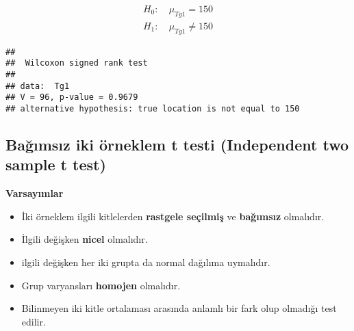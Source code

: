 \documentclass[
]{article}
\newenvironment{Shaded}{\begin{snugshade}}{\end{snugshade}}
\newcommand{\AttributeTok}[1]{\textcolor[rgb]{0.77,0.63,0.00}{#1}}
\newcommand{\CommentTok}[1]{\textcolor[rgb]{0.56,0.35,0.01}{\textit{#1}}}
\newcommand{\ConstantTok}[1]{\textcolor[rgb]{0.00,0.00,0.00}{#1}}
\newcommand{\DecValTok}[1]{\textcolor[rgb]{0.00,0.00,0.81}{#1}}
\newcommand{\FunctionTok}[1]{\textcolor[rgb]{0.00,0.00,0.00}{#1}}
\newcommand{\NormalTok}[1]{#1}
\newcommand{\SpecialCharTok}[1]{\textcolor[rgb]{0.00,0.00,0.00}{#1}}
\newcommand{\StringTok}[1]{\textcolor[rgb]{0.31,0.60,0.02}{#1}}
\providecommand{\tightlist}{%
  \setlength{\itemsep}{0pt}\setlength{\parskip}{0pt}}
\begin{document}
\begin{align*}
  H_0:&~ \mu_{Tg1} = 150 \\
  H_1:&~ \mu_{Tg1} \neq 150
  
\end{align*}

\begin{Shaded}
\end{Shaded}

\begin{verbatim}
## 
##  Wilcoxon signed rank test
## 
## data:  Tg1
## V = 96, p-value = 0.9679
## alternative hypothesis: true location is not equal to 150
\end{verbatim}

\hypertarget{baux11fux131msux131z-iki-uxf6rneklem-t-testi-independent-two-sample-t-test}{%
\subsection{Bağımsız iki örneklem t testi (Independent two sample t
test)}\label{baux11fux131msux131z-iki-uxf6rneklem-t-testi-independent-two-sample-t-test}}

\textbf{Varsayımlar}

\begin{itemize}
\tightlist
\item
  İki örneklem ilgili kitlelerden \textbf{rastgele seçilmiş} ve
  \textbf{bağımsız} olmalıdır.
\item
  İlgili değişken \textbf{nicel} olmalıdır.
\item
  ilgili değişken her iki grupta da normal dağılıma uymalıdır.
\item
  Grup varyansları \textbf{homojen} olmalıdır.
\item
  Bilinmeyen iki kitle ortalaması arasında anlamlı bir fark olup
  olmadığı test edilir.
\end{itemize}
\end{document}
